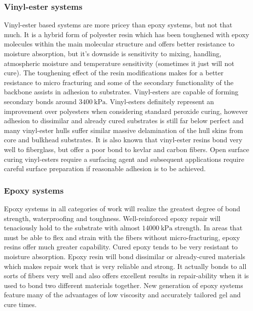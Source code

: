 \subsubsection{Vinyl-ester systems}\label{subsec:vinyl_ester}
Vinyl-ester based systems are more pricey than epoxy systems, but not that much. It is a hybrid form of polyester resin which has been toughened with epoxy molecules within the main molecular structure and offers better resistance to moisture absorption, but it's downside is sensitivity to mixing, handling, atmospheric moisture and temperature sensitivity (sometimes it just will not cure). The toughening effect of the resin modifications makes for a better resistance to micro fracturing and some of the secondary functionality of the backbone assists in adhesion to substrates. Vinyl-esters are capable of forming secondary bonds around $3400~\mathrm{kPa}$. Vinyl-esters definitely represent an improvement over polyesters when considering standard peroxide curing, however adhesion to dissimilar and already cured substrates is still far below perfect and many vinyl-ester hulls suffer similar massive delamination of the hull skins from core and bulkhead substrates. It is also known that vinyl-ester resins bond very well to fiberglass, but offer a poor bond to kevlar and carbon fibers.  Open surface curing vinyl-esters require a surfacing agent and subsequent applications require careful surface preparation if reasonable adhesion is to be achieved.

\subsubsection{Epoxy systems}\label{subsec:epoxy_systems}
Epoxy systems in all categories of work will realize the greatest degree of bond strength, waterproofing and toughness. Well-reinforced epoxy repair will tenaciously hold to the substrate with almost $14 000~\mathrm{kPa}$ strength. In areas that must be able to flex and strain with the fibers without micro-fracturing, epoxy resins offer much greater capability. Cured epoxy tends to be very resistant to moisture absorption. Epoxy resin will bond dissimilar or already-cured materials which makes repair work that is  very reliable and strong. It actually bonds to all sorts of fibers very well and also offers excellent results in repair-ability when it is used to bond two different materials together. New generation of epoxy systems feature many of the advantages of low viscosity and accurately tailored gel and cure times. 

